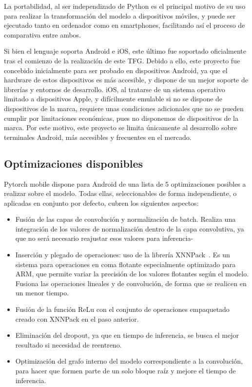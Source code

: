 La portabilidad, al ser independizado de Python es el principal motivo de su uso para realizar la transformación del modelo a dispositivos móviles, y puede ser ejecutado tanto en ordenador como en smartphones, facilitando así el proceso de comparativa entre ambos.

Si bien el lenguaje soporta Android e iOS,  este último fue soportado oficialmente tras el comienzo de la realización de este TFG. Debido a ello, este proyecto fue concebido inicialmente para ser probado en dispositivos Android, ya que el hardware de estos dispositivos es más accesible, y dispone de un mejor soporte de librerías y entornos de desarrollo. iOS, al tratarse de un sistema operativo limitado a dispositivos Apple, y difícilmente emulable si no se dispone de dispositivos de la marca, requiere unas condiciones adicionales que no se pueden cumplir por limitaciones económicas, pues no disponemos de dispositivos de la marca. Por este motivo, este proyecto se limita únicamente al desarrollo sobre terminales Android, más accesibles y frecuentes en el mercado.

\subsection{Optimizaciones disponibles}

Pytorch mobile dispone para Android de una lista de 5 optimizaciones posibles a realizar sobre el modelo. Todas ellas, seleccionables de forma independiente, o aplicadas en conjunto por defecto, cubren los siguientes aspectos:

\begin{itemize}
	\item Fusión de las capas de convolución y normalización de batch. Realiza una integración de los valores de normalización dentro de la capa convolutiva, ya que no será necesario reajustar esos valores para inferencia-
	\item Inserción y plegado de operaciones: uso de la librería XNNPack~\cite{xnnpack}. Es un sistema para operaciones en coma flotante especialmente optimizado para ARM, que permite variar la precisión de los valores flotantes según el modelo. Fusiona las operaciones lineales y de convolución, de forma que se realicen en un menor tiempo.
	\item Fusión de la función ReLu con el conjunto de operaciones empaquetado creado con XNNPack en el paso anterior.
	\item Eliminación del dropout, ya que en tiempo de inferencia, se busca el mejor resultado si necesidad de reentreno.
	\item Optimización del grafo interno del modelo correspondiente a la convolución, para hacer que formen parte de un solo bloque raíz y mejore el tiempo de inferencia.	
\end{itemize}

